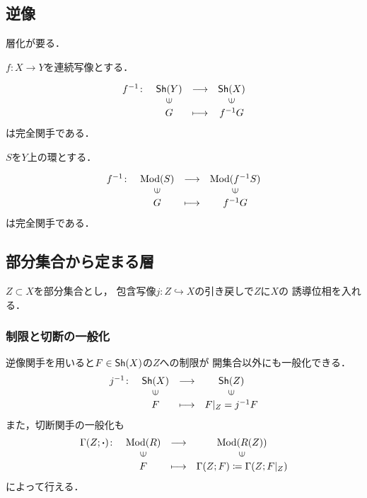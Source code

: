 \subsection{逆像}
層化が要る．

\(f\colon X\to Y\)を連続写像とする．

\begin{PRP}
    \[
        \begin{array}{rccc}
            f^{-1}\colon&   \Sh(Y) & \longrightarrow& \Sh(X) \\
            &   \rotatebox{90}{$\in$}&&\rotatebox{90}{$\in$}\\
            &   G&  \longmapsto&    f^{-1} G   
        \end{array}
    \]
    は完全関手である．
\end{PRP}


\(S\)を\(Y\)上の環とする．

\begin{PRP}
    \[
        \begin{array}{rccc}
            f^{-1}\colon&   \Mod(S)& \longrightarrow& \Mod(f^{-1}S)\\
            &   \rotatebox{90}{$\in$}&&\rotatebox{90}{$\in$}\\
            &   G&  \longmapsto&    f^{-1} G   
        \end{array}
    \]
    は完全関手である．
\end{PRP}



\subsection{部分集合から定まる層}

\(Z\subset X\)を部分集合とし，
包含写像\(j\colon Z\hookrightarrow X\)の引き戻しで\(Z\)に\(X\)の
誘導位相を入れる．

\subsubsection{制限と切断の一般化}
逆像関手を用いると\(F\in\mathop{\textsf{Sh}}\nolimits(X)\)の\(Z\)への制限が
開集合以外にも一般化できる．
\[
    \begin{array}{rccc}
        j^{-1}\colon&   \Sh(X)& \longrightarrow& \Sh(Z)\\
        &   \rotatebox{90}{$\in$}&&\rotatebox{90}{$\in$}\\
        &   F&  \longmapsto&    F|_Z=j^{-1} F   
    \end{array}
\]
また，切断関手の一般化も
\[
    \begin{array}{rccc}
        \Gamma(Z;{\boldsymbol{\cdot}})\colon&\Mod(R)&\longrightarrow&\Mod(R(Z))\\
        &\rotatebox{90}{$\in$}&&\rotatebox{90}{$\in$}\\
        &F&\longmapsto&\Gamma(Z;F)\coloneqq \Gamma(Z;F|_Z)
    \end{array}
\]
によって行える．


